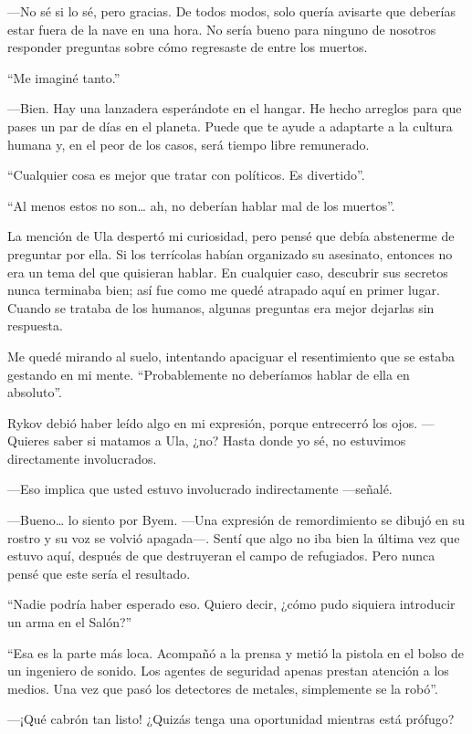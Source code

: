 —No sé si lo sé, pero gracias. De todos modos, solo quería avisarte que deberías estar fuera de la nave en una hora. No sería bueno para ninguno de nosotros responder preguntas sobre cómo regresaste de entre los muertos.

``Me imaginé tanto.''


—Bien. Hay una lanzadera esperándote en el hangar. He hecho arreglos para que pases un par de días en el planeta. Puede que te ayude a adaptarte a la cultura humana y, en el peor de los casos, será tiempo libre remunerado.

``Cualquier cosa es mejor que tratar con políticos. Es divertido''.

``Al menos estos no son… ah, no deberían hablar mal de los muertos''.

La mención de Ula despertó mi curiosidad, pero pensé que debía abstenerme de preguntar por ella. Si los terrícolas habían organizado su asesinato, entonces no era un tema del que quisieran hablar. En cualquier caso, descubrir sus secretos nunca terminaba bien; así fue como me quedé atrapado aquí en primer lugar. Cuando se trataba de los humanos, algunas preguntas era mejor dejarlas sin respuesta.

Me quedé mirando al suelo, intentando apaciguar el resentimiento que se estaba gestando en mi mente. ``Probablemente no deberíamos hablar de ella en absoluto''.

Rykov debió haber leído algo en mi expresión, porque entrecerró los ojos. —Quieres saber si matamos a Ula, ¿no? Hasta donde yo sé, no estuvimos directamente involucrados.

—Eso implica que usted estuvo involucrado indirectamente —señalé.

—Bueno… lo siento por Byem. —Una expresión de remordimiento se dibujó en su rostro y su voz se volvió apagada—. Sentí que algo no iba bien la última vez que estuvo aquí, después de que destruyeran el campo de refugiados. Pero nunca pensé que este sería el resultado.

``Nadie podría haber esperado eso. Quiero decir, ¿cómo pudo siquiera introducir un arma en el Salón?''


``Esa es la parte más loca. Acompañó a la prensa y metió la pistola en el bolso de un ingeniero de sonido. Los agentes de seguridad apenas prestan atención a los medios. Una vez que pasó los detectores de metales, simplemente se la robó''.

—¡Qué cabrón tan listo! ¿Quizás tenga una oportunidad mientras está prófugo?

